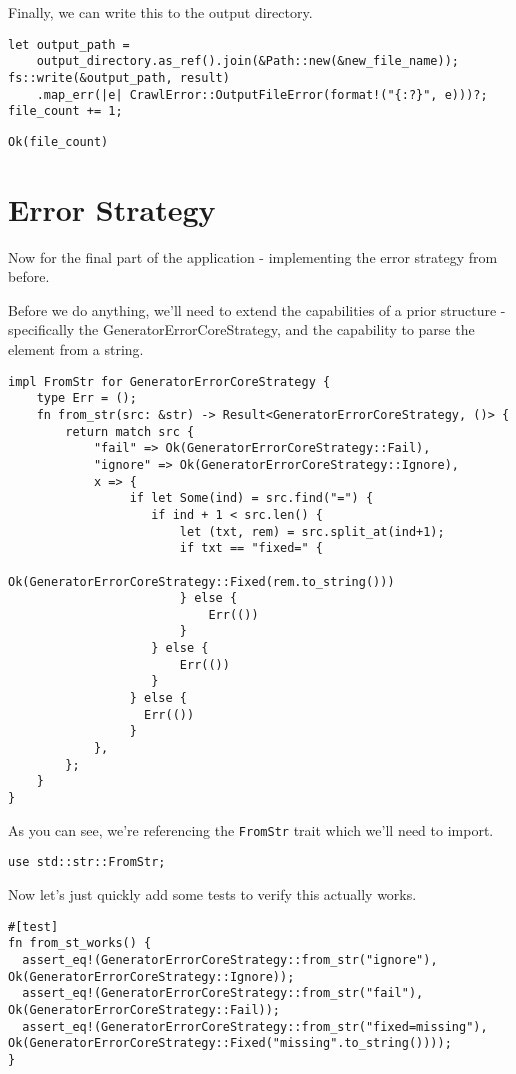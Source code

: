 \documentclass[11pt]{article}
\begin{document}
Finally, we can write this to the output directory.
\begin{verbatim}
let output_path = 
    output_directory.as_ref().join(&Path::new(&new_file_name));
fs::write(&output_path, result)
    .map_err(|e| CrawlError::OutputFileError(format!("{:?}", e)))?;
file_count += 1;
\end{verbatim}



\begin{verbatim}
Ok(file_count)
\end{verbatim}

\section{Error Strategy}
\label{sec:orgfe216cc}
Now for the final part of the application - implementing the error strategy from before.

Before we do anything, we'll need to extend the capabilities of a prior structure - specifically the GeneratorErrorCoreStrategy, and 
the capability to parse the element from a string.
\begin{verbatim}
impl FromStr for GeneratorErrorCoreStrategy {
    type Err = ();
    fn from_str(src: &str) -> Result<GeneratorErrorCoreStrategy, ()> {
        return match src {
            "fail" => Ok(GeneratorErrorCoreStrategy::Fail),
            "ignore" => Ok(GeneratorErrorCoreStrategy::Ignore),
            x => {
                 if let Some(ind) = src.find("=") {
                    if ind + 1 < src.len() {
                        let (txt, rem) = src.split_at(ind+1);
                        if txt == "fixed=" {
                            Ok(GeneratorErrorCoreStrategy::Fixed(rem.to_string()))
                        } else {
                            Err(())
                        }
                    } else {
                        Err(())
                    }
                 } else {
                   Err(())
                 }
            },
        };
    }
}
\end{verbatim}

As you can see, we're referencing the \texttt{FromStr} trait which we'll need to import.
\begin{verbatim}
use std::str::FromStr;
\end{verbatim}


Now let's just quickly add some tests to verify this actually works.
\begin{verbatim}
#[test]
fn from_st_works() {
  assert_eq!(GeneratorErrorCoreStrategy::from_str("ignore"), Ok(GeneratorErrorCoreStrategy::Ignore));
  assert_eq!(GeneratorErrorCoreStrategy::from_str("fail"), Ok(GeneratorErrorCoreStrategy::Fail));
  assert_eq!(GeneratorErrorCoreStrategy::from_str("fixed=missing"), Ok(GeneratorErrorCoreStrategy::Fixed("missing".to_string())));
}
\end{verbatim}
\end{document}
